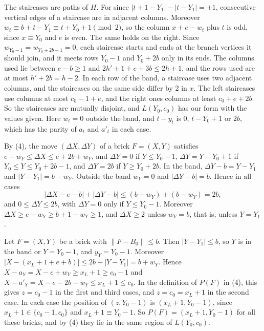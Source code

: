{The staircases are paths of $H$. For since $|t + 1 - Y_1| - |t - Y_1| = \pm 1$, consecutive vertical edges of a staircase are in adjacent columns. Moreover $w_t \equiv b + t - Y_1 \equiv t + Y_0 + 1 \pmod 2$, so the column $x + e - w_t$ plus $t$ is odd, since $x \equiv Y_0$ and $e$ is even. The same holds on the right. Since $w_{Y_0 - 1} = w_{Y_0 + 2b - 1} = 0$, each staircase starts and ends at the branch vertices it should join, and it meets rows $Y_0 - 1$ and $Y_0 + 2b$ only in its ends. The columns used lie between $e - b \ge 1$ and $2h' + 1 + e + 3b \le 2h + 1$, and the rows used are at most $h' + 2b = h - 2$. In each row of the band, a staircase uses two adjacent columns, and the staircases on the same side differ by $2$ in $x$. The left staircases use columns at most $c_0 - 1 + e$, and the right ones columns at least $c_0 + e + 2b$. So the staircases are mutually disjoint, and $L(Y_0, c_0)$ has our form with the values given. Here $w_t = 0$ outside the band, and $t - y_t$ is $0$, $t - Y_0 + 1$ or $2b$, which has the parity of $a_t$ and $a'_t$ in each case.

By (4), the move $(\Delta X, \Delta Y)$ of a brick $F = (X, Y)$ satisfies $e - w_Y \le \Delta X \le e + 2b + w_Y$, and $\Delta Y = 0$ if $Y \le Y_0 - 1$, $\Delta Y = Y - Y_0 + 1$ if $Y_0 \le Y \le Y_0 + 2b - 1$, and $\Delta Y = 2b$ if $Y \ge Y_0 + 2b$. In the band, $\Delta Y - b = Y - Y_1$ and $|Y - Y_1| = b - w_Y$. Outside the band $w_Y = 0$ and $|\Delta Y - b| = b$. Hence in all cases
\begin{equation*}
|\Delta X - e - b| + |\Delta Y - b| \le (b + w_Y) + (b - w_Y) = 2b,
\end{equation*}
and $0 \le \Delta Y \le 2b$, with $\Delta Y = 0$ only if $Y \le Y_0 - 1$. Moreover $\Delta X \ge e - w_Y \ge b + 1 - w_Y \ge 1$, and $\Delta X \ge 2$ unless $w_Y = b$, that is, unless $Y = Y_1$.

Let $F = (X, Y)$ be a brick with $\|F - B_0\| \le b$. Then $|Y - Y_1| \le b$, so $Y$ is in the band or $Y = Y_0 - 1$, and $y_Y = Y_0 - 1$. Moreover $|X - (x_L + 1 + e + b)| \le 2b - |Y - Y_1| = b + w_Y$. Hence $X - a_Y = X - e + w_Y \ge x_L + 1 \ge c_0 - 1$ and $X - a'_Y = X - e - 2b - w_Y \le x_L + 1 \le c_0$. In the definition of $P(F)$ in (4), this gives $z = c_0 - 1$ in the first and third cases, and $z = c_0 = x_L + 1$ in the second case. In each case the position of $(z, Y_0 - 1)$ is $(x_L + 1, Y_0 - 1)$, since $x_L + 1 \in \{c_0 - 1, c_0\}$ and $x_L + 1 \equiv Y_0 - 1$. So $P(F) = (x_L + 1, Y_0 - 1)$ for all these bricks, and by (4) they lie in the same region of $L(Y_0, c_0)$.

}
